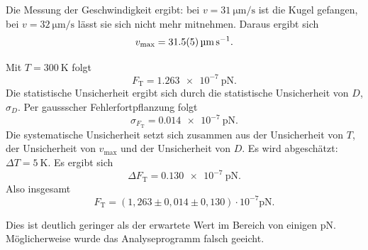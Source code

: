 Die Messung der Geschwindigkeit ergibt: bei $v=\SI{31}{\micro\meter\per\second}$ ist die Kugel gefangen, bei $v=\SI{32}{\micro\meter\per\second}$ lässt sie sich nicht mehr mitnehmen. Daraus ergibt sich
\begin{equation}
 v_{\textrm{max}} = \SI{31,5\pm0,5}{\micro\meter\per\second}.
\end{equation}

Mit $T=\SI{300}{\kelvin}$ folgt
\begin{equation}
 F_{\textrm{T}} =  \SI{1,263e-7}{\pico\newton}.
\end{equation}
Die statistische Unsicherheit ergibt sich durch die statistische Unsicherheit von $D$, $\sigma_{D}$. Per gaussscher Fehlerfortpflanzung folgt
\begin{equation}
 \sigma_{F_{\textrm{T}}} = \SI{0,014e-7}{\pico\newton}.
\end{equation}
Die systematische Unsicherheit setzt sich zusammen aus der Unsicherheit von $T$, der Unsicherheit von $v_{\textrm{max}}$ und der Unsicherheit von $D$. Es wird abgeschätzt: $\Delta T = \SI{5}{\kelvin}$.
Es ergibt sich
\begin{equation}
 \Delta F_{\textrm{T}} = \SI{0,130e-7}{\pico\newton}.
\end{equation}
Also insgesamt
\begin{equation}
 F_{\textrm{T}} = (1,263\pm0,014\pm0,130)\cdot 10^{-7} \si{\pico\newton}.
\end{equation}

Dies ist deutlich geringer als der erwartete Wert im Bereich von einigen $\si{\pico\newton}$. Möglicherweise wurde das Analyseprogramm falsch geeicht.

